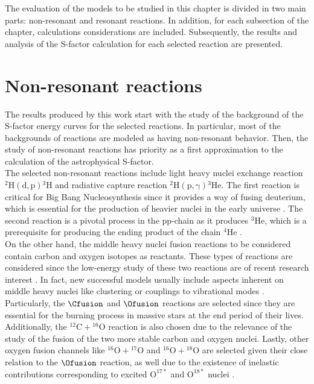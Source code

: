 \documentclass[openany]{book}
\begin{document}
The evaluation of the models to be studied in this chapter is divided in two main parts: non-resonant and resonant reactions.  In addition, for each subsection of the chapter, calculations considerations are included. Subsequently, the results and analysis of the S-factor calculation for each  selected reaction are presented.

\section{Non-resonant reactions} \label{sec:nonResonant}

The results produced by this work start with the study of the background of the S-factor energy curves for the selected reactions. In particular, most of the backgrounds of reactions are modeled as having non-resonant behavior. Then, the study of non-resonant reactions has priority as a first approximation to the calculation of the astrophysical S-factor. \\

The selected non-resonant reactions include light heavy nuclei exchange reaction $\mathrm{{}^{2}{H}(d,p){}^{3}{H}} $ and radiative capture reaction  $\mathrm{{}^{2}{H} (p, \gamma) {}^{3}{He}} $. The first reaction is critical for Big Bang Nucleosynthesis since it provides a way of fusing deuterium, which is essential for the production of heavier nuclei in the early universe \cite{coc_vangioni_2010}. The second reaction is a pivotal process in the pp-chain as it produces $\mathrm{{}^{3}He}$, which is a prerequisite  for producing the ending product of the chain $\mathrm{{}^{4}He}$ \cite{fowler_1958}. \\

 On the other hand, the middle heavy nuclei fusion reactions to be considered contain carbon and oxygen isotopes as reactants. These types of reactions are considered since the low-energy study of these two reactions are of recent research interest \cite{torilov_maltsev_zherebchevsky_2021, taniguchi_kimura_2021,mukhamedzhanov_pang_kadyrov_2019}. In fact, new successful models usually include aspects inherent on middle heavy nuclei like clustering \cite{assuncao_descouvemont_2016} or couplings to vibrational modes \cite{duarte_gasques_oliveira_zagatto_chamon_medina_added_seale_alcantara-nunez_rossi_et_2015}. \\
 
 Particularly, the $\Cfusion$  and $\Ofusion$ reactions are selected since they are essential for the burning process in massive stars at the end period of their lives. Additionally, the $\mathrm{{}^{12}C + {}^{16}O}$ reaction is also chosen due to the relevance of the study of the fusion of the two more stable carbon and oxygen nuclei. Lastly, other oxygen fusion channels like $\mathrm{{}^{16}O + {}^{17}O}$ and $\mathrm{{}^{16}O + {}^{18}O}$ are selected given their close relation to the $\Ofusion$ reaction, as well due to the existence of inelastic contributions corresponding to excited $\mathrm{O^{17*}}$ and $\mathrm{O^{18*}}$ nuclei \cite{thomas_chen_hinds_meredith_olson_1986}.   \\
\end{document}
